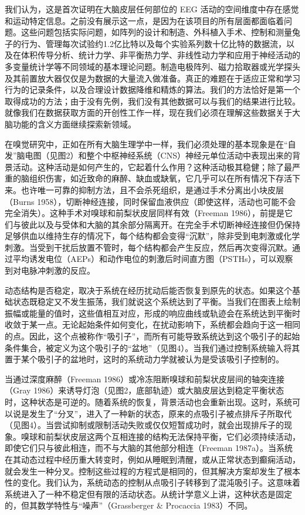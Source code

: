 \documentclass[a4paper,12pt]{article}
\begin{document}
我们认为，这是首次证明在大脑皮层任何部位的 EEG 活动的空间维度中存在感觉和运动特定信息。之前没有展示这一点，是因为在该项目的所有层面都面临着问题。这些问题包括实际问题，如阵列的设计和制造、外科植入手术、控制和测量兔子的行为、管理每次试验约1.2亿比特以及每个实验系列数十亿比特的数据流，以及在体积传导分析、统计力学、非平衡热力学、非线性动力学和应用于神经活动的多变量统计学等不同领域的基本理论问题。制造电极阵列、磁力拾取器或光学探头及其前置放大器仅仅是为数据的大量流入做准备。真正的难题在于适应正常和学习行为的记录条件，以及合理设计数据降维和精炼的算法。我们的方法恰好是第一个取得成功的方法；由于没有先例，我们没有其他数据可以与我们的结果进行比较。就像我们在数据获取方面的开创性工作一样，现在我们必须在理解这些数据关于大脑功能的含义方面继续探索新领域。

在嗅觉研究中，正如在所有大脑生理学中一样，我们必须处理的基本现象是在“自发”脑电图（见图2）和整个中枢神经系统（CNS）神经元单位活动中表现出来的背景活动。这种活动是如何产生的，它起着什么作用？这种活动极其稳健；除了最严重的脑组织伤害，如近致命的麻醉、缺血或缺氧，它几乎可以在所有情况下存活下来。也许唯一可靠的抑制方法，且不会杀死组织，是通过手术分离出小块皮层（Burns 1958），切断神经连接，同时保留血液供应（即使这样，活动也可能不会完全消失）。这种手术对嗅球和前梨状皮层同样有效（Freeman 1986），前提是它们与彼此以及与受体和大脑的其余部分隔离开。在完全手术切断神经连接但仍保持足够供血以维持生存的情况下，每个结构都会变得“沉默”，除非受到电刺激或化学刺激。当受到干扰后放置不管时，每个结构都会产生反应，然后再次变得沉默。通过平均诱发电位（AEPs）和动作电位的刺激后时间直方图（PSTHs），可以观察到对电脉冲刺激的反应。

动态结构是否稳定，取决于系统在经历扰动后能否恢复到原先的状态。如果这个基础状态既稳定又不发生振荡，我们就说这个系统达到了平衡。当我们在图表上绘制振幅或能量的值时，这些值相互对应，形成的响应曲线或轨迹会在系统达到平衡时收敛于某一点。无论起始条件如何变化，在扰动影响下，系统都会趋向于这一相同的点。因此，这个点被称作“吸引子”，而所有可能导致系统达到这个吸引子的起始条件集合，被定义为这个吸引子的“盆地”（见图4）。当我们通过控制系统输入将其置于某个吸引子的盆地时，这时的系统动力学就被认为是受该吸引子控制的。

当通过深度麻醉（Freeman 1986）或冷冻阻断嗅球和前梨状皮层间的轴突连接（Gray 1986）来诱导灯泡（见图2，底部轨迹）或大脑皮层达到稳定平衡状态时，这种状态是可逆的。随着系统的恢复，背景活动也会重新出现。这时，系统可以说是发生了“分叉”，进入了一种新的状态，原来的点吸引子被点排斥子所取代（见图4）。当尝试抑制或限制活动失败或仅仅短暂成功时，就会出现排斥子的现象。嗅球和前梨状皮层这两个互相连接的结构无法保持平衡，它们必须持续活动，即使它们只与彼此相连，而不与大脑的其他部分相连（Freeman 1987a）。当系统在其动态过程中经历重大转变时，例如从睡眠到清醒，或从正常状态到癫痫活动，就会发生一种分叉。控制这些过程的方程式是相同的，但其解决方案却发生了根本性的变化。我们认为，系统动态的控制从点吸引子转移到了混沌吸引子。这意味着系统进入了一种不稳定但有限的活动状态。从统计学意义上讲，这种状态是固定的，但其数学特性与“噪声”（Grassberger \& Procaccia 1983）不同。
\end{document}
